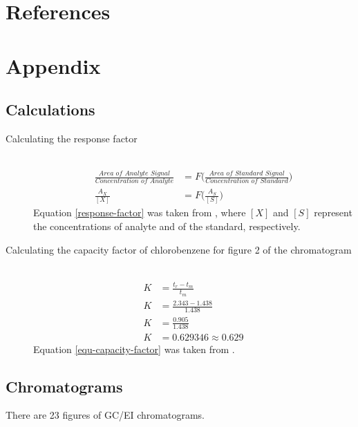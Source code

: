 \documentclass[a4paper, 12pt]{article}
\begin{document}

\section{References}
\printbibliography


\section{Appendix}

\subsection{Calculations}


\begin{description}

	\item[Calculating the response factor] \hfill \\
		\begin{equation} \label{response-factor}
			\begin{split}
				\frac{\textit{Area of Analyte Signal}}{\textit{Concentration of Analyte}} & = F\Bigg(\frac{\textit{Area of Standard Signal}}{\textit{Concentration of Standard}}\Bigg) \\
				\frac{A_X}{[X]} & = F\Bigg(\frac{A_S}{[S]}\Bigg)
			\end{split}
		\end{equation}
		Equation \ref{response-factor} was taken from \cite{harris}, where $[X]$ and $[S]$ represent the concentrations of analyte and of the standard, respectively.

	\item[Calculating the capacity factor of chlorobenzene for figure 2 of the chromatogram] \hfill \\
		\begin{equation} \label{equ-capacity-factor}
			\begin{split}
				K & = \frac{t_r - t_m}{t_m} \\
				K & = \frac{2.343 - 1.438}{1.438} \\
				K & = \frac{0.905}{1.438} \\
				K & = 0.629346 \approx 0.629
			\end{split}
		\end{equation}
		Equation \ref{equ-capacity-factor} was taken from \cite{harris}.

\end{description}


\subsection{Chromatograms}
There are 23 figures of GC/EI chromatograms.

\end{document}
